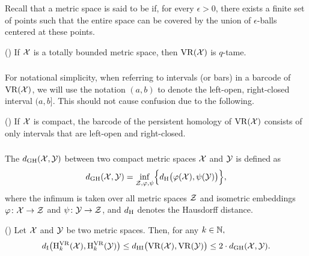 Recall that a metric space is said to be  if, for every $\epsilon > 0$, there exists a finite set of points such that the entire space can be covered by the union of $\epsilon$-balls centered at these points.

\proposition (\cite[Prop.~5.1]{chazal2014geometric})
If $\cX$ is a totally bounded metric space, then $\VR(\cX)$ is $q$-tame.

\subsubsection{}

For notational simplicity, when referring to intervals (or bars) in a barcode of $\VR(\cX)$, we will use the notation $(a, b)$ to denote the left-open, right-closed interval $(a, b]$.
This should not cause confusion due to the following.

\proposition (\cite[Thm.~5.2]{lim2024vietoris})
If $\cX$ is compact, the barcode of the persistent homology of $\VR(\cX)$ consists of only intervals that are left-open and right-closed.

\subsubsection{}\label{thm:stability-HI}

The  $\dgh(\cX, \cY)$ between two compact metric spaces $\cX$ and $\cY$ is defined as
\[
\dgh(\cX, \cY) = \inf_{\cZ, \varphi, \psi} \set[\Big]{d_\rH\big(\varphi(\cX), \psi(\cY)\big)},
\]
where the infimum is taken over all metric spaces $\cZ$ and isometric embeddings $\varphi \colon \cX \to \cZ$ and $\psi \colon \cY \to \cZ$, and $d_\rH$ denotes the Hausdorff distance.

\proposition (\cite[Thm.~1.9 \& 1.10]{blumberg2023interleaving})
Let $\cX$ and $\cY$ be two metric spaces.
Then, for any $k \in \N,$
\[
\di\big(\rH_k^\VR(\cX), \rH_k^\VR(\cY)\big) \leq
\dhi\big(\VR(\cX), \VR(\cY)\big) \leq
2 \cdot \dgh(\cX, \cY).
\]